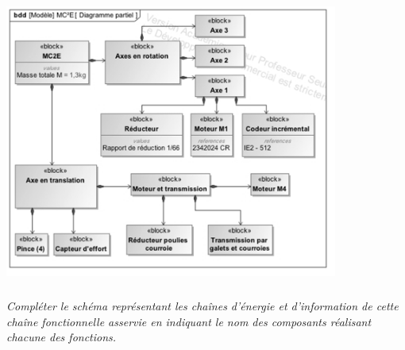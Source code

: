 \documentclass[10pt,fleqn]{article} %
\begin{document}
\begin{center}
\begin{center}
\includegraphics[height=9cm]{images/fig_03}
\end{center}
\end{center}

\subparagraph{}
\textit{Compléter le schéma représentant les chaînes d’énergie et d’information de cette chaîne
fonctionnelle asservie en indiquant le nom des composants réalisant chacune des fonctions.}

%
%
%
%
%
%
\end{document}
